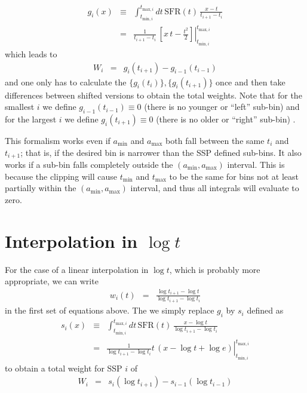 \documentclass[12pt, letterpaper, preprint]{aastex}
\newcommand{\tmin}[1][]{t_{\mathrm{min} #1}}
\newcommand{\tmax}[1][]{t_{\mathrm{max} #1}}
\newcommand{\amin}{a_{\mathrm{min}}}
\newcommand{\amax} {a_{\mathrm{max}}}
\newcommand{\tintegral}{\int_{\tmin[,i]}^{\tmax[,i]} dt}
\newcommand{\tinterval}{\right|_{\tmin[,i]}^{\tmax[,i]}}
\begin{document}
\begin{eqnarray}
g_i(x) & \equiv & \tintegral \, \mathrm{SFR}(t) \, \frac{x - t}{t_{i+1}  - t_i} \nonumber  \\
 & = & \left. \frac{1}{t_{i+1} - t_i} \, \left[ x\, t - \frac{t^2}{2} \right] \tinterval
\end{eqnarray}
which leads to
\begin{eqnarray}
W_i & = & g_{i}(t_{i+1}) - g_{i-1}(t_{i-1})
\end{eqnarray}
and one only has to calculate the $\{g_i(t_i)\}, \{g_i(t_{i+1})\}$ once and then take differences between shifted versions to obtain the total weights.
Note that for the smallest $i$ we define $g_{i-1}(t_{i-1})\equiv 0$ (there is no younger or ``left'' sub-bin) 
and for the largest $i$ we define $g_{i}(t_{i+1}) \equiv 0$ (there is no older or ``right'' sub-bin) .

This formalism works even if $\amin$ and $\amax$ both fall between the same $t_i$ and $t_{i+1}$; that is, if the desired bin is narrower than the SSP defined sub-bins.
It also works if a sub-bin falls completely outside the $(\amin, \amax)$ interval.
This is because the clipping will cause $\tmin$ and $\tmax$ to be the same for bins not at least partially within the $(\amin, \amax)$ interval, and thus all integrals will evaluate to zero.

\section{Interpolation in $\log t$}

For the case of a linear interpolation in $\log t$, which is probably more appropriate, we can write
\begin{eqnarray}
w_{i}(t) & = & \frac{ \log t_{i+1} - \log t}{ \log t_{i+1}  - \log t_i} \nonumber
\end{eqnarray}
in the first set of equations above. The we simply replace $g_i$ by $s_i$ defined as 
\begin{eqnarray}
s_i(x) & \equiv & \tintegral \, \mathrm{SFR}(t) \, \frac{x - \log t}{\log t_{i+1}  - \log t_i} \nonumber \\
 & = & \left. \frac{1}{\log t_{i+1} - \log t_i} t \, \left( x - \log t + \log e \right) \tinterval
\end{eqnarray}
to obtain a total weight for SSP $i$ of
\begin{eqnarray}
W_i & = & s_{i}(\log t_{i+1}) - s_{i-1}(\log t_{i-1}) \nonumber
\end{eqnarray}
\end{document}
